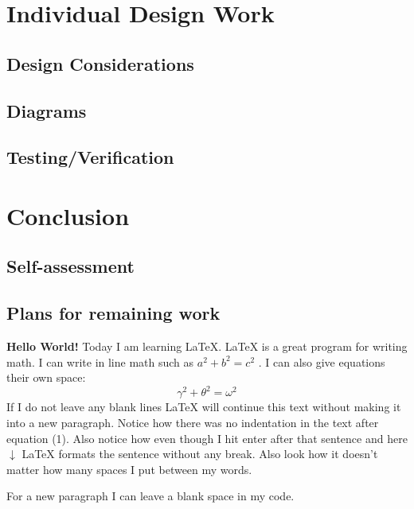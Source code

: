\documentclass{report}
\begin{document}
    \chapter{Individual Design Work}
    \section{Design Considerations}

    \section{Diagrams}

    \section{Testing/Verification}

    \chapter{Conclusion}

    \section{Self-assessment}

    \section{Plans for remaining work}

    
    \textbf{Hello World!} Today I am learning \LaTeX. %
     \LaTeX{} is a great program for writing math. I can write in line math such as $a^2+b^2=c^2$ %
     . I can also give equations their own space: \cite{IEEE_2020}
    \begin{equation} %
    \gamma^2+\theta^2=\omega^2 
    \end{equation}
    If I do not leave any blank lines \LaTeX{} will continue  this text without making it into a new paragraph.  Notice how there was no indentation in the text after equation (1).  
    Also notice how even though I hit enter after that sentence and here $\downarrow$
     \LaTeX{} formats the sentence without any break.  Also   look  how      it   doesn't     matter          how    many  spaces     I put     between       my    words.
    
    For a new paragraph I can leave a blank space in my code. 


    
    
\end{document}
